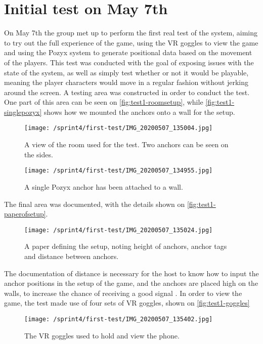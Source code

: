 \section{Initial test on May 7th}\label{sec:initial-test}
On May 7th the group met up to perform the first real test of the system, aiming to try out the full experience of the game, using the VR goggles to view the game and using the Pozyx system to generate positional data based on the movement of the players.
This test was conducted with the goal of exposing issues with the state of the system, as well as simply test whether or not it would be playable, meaning the player characters would move in a regular fashion without jerking around the screen.
A testing area was constructed in order to conduct the test.
One part of this area can be seen on \autoref{fig:test1-roomsetup}, while \autoref{fig:test1-singlepozyx} shows how we mounted the anchors onto a wall for the setup.
\begin{figure}[]
    \centering
    \texttt{[image: /sprint4/first-test/IMG\_20200507\_135004.jpg]}
    \caption{A view of the room used for the test. Two anchors can be seen on the sides.}
    \label{fig:test1-roomsetup}
\end{figure}
\begin{figure}[]
    \centering
    \texttt{[image: /sprint4/first-test/IMG\_20200507\_134955.jpg]}
    \caption{A single Pozyx anchor has been attached to a wall.}
    \label{fig:test1-singlepozyx}
\end{figure}
\noindent
The final area was documented, with the details shown on \autoref{fig:test1-paperofsetup}.
\begin{figure}[]
    \centering
    \texttt{[image: /sprint4/first-test/IMG\_20200507\_135024.jpg]}
    \caption{A paper defining the setup, noting height of anchors, anchor tags and distance between anchors.}
    \label{fig:test1-paperofsetup}
\end{figure}
\noindent
The documentation of distance is necessary for the host to know how to input the anchor positions in the setup of the game, and the anchors are placed high on the walls, to increase the chance of receiving a good signal \cite{pozyx-AnchorHeights}.
In order to view the game, the test made use of four sets of VR goggles, shown on \autoref{fig:test1-goggles}
\begin{figure}[]
    \centering
    \texttt{[image: /sprint4/first-test/IMG\_20200507\_135402.jpg]}
    \caption{The VR goggles used to hold and view the phone.}
    \label{fig:test1-goggles}
\end{figure}
\noindent

